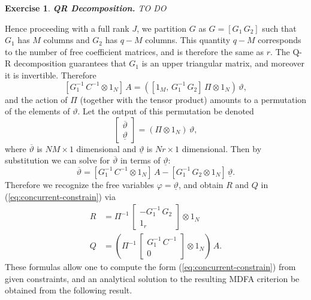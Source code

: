 \documentclass[a4paper]{book}
\newtheorem{Exercise}{Exercise}
\begin{document}
 \begin{Exercise} {\bf QR Decomposition.} \rm
 \label{exer:qr.constraint}
 TO DO
 \end{Exercise}
 
 Hence  proceeding with a full rank $J$, we partition $G$ as $G = [ G_1 \, G_2]$ 
 such that $G_1$ has $M$ columns and $G_2$
 has $q-M$ columns.  This quantity $q-M$ corresponds to the number 
 of free coefficient matrices, and is therefore the same as $r$.
 The Q-R decomposition guarantees that $G_1$ is an upper triangular matrix, 
 and moreover it is invertible.  Therefore
\[
  \left[ G_1^{-1} \, C^{-1} \otimes 1_N \right] \, A  = \left( \left[ 1_M , \, G_1^{-1} \, G_2 \right] \, \Pi \otimes 1_N  \right) \, \vartheta,
\]
 and the action of $\Pi$ (together with the tensor product) amounts 
 to a   permutation of the elements of $\vartheta$.
  Let the output of this permutation be denoted
\[
   \left[ \begin{array}{l} \overline{\vartheta} \\ \underline{\vartheta} \end{array} \right]
   = \left( \Pi \otimes 1_N \right) \, \vartheta,
\]
 where $\overline{\vartheta}$ is $N M \times 1$ dimensional and
 $\underline{\vartheta}$ is $N r \times 1$ dimensional.  
 Then  by substitution we can solve for $\overline{\vartheta}$ in terms 
 of $\underline{\vartheta}$:
\[
   \overline{\vartheta} =  \left[ G_1^{-1} \, C^{-1} \otimes 1_N \right] \, A - 
   \left[  G_1^{-1} \, G_2  \otimes 1_N   \right] \, \underline{\vartheta}.
\]
 Therefore we recognize the free variables $\varphi = \underline{\vartheta}$, 
 and obtain $R$ and $Q$ in (\ref{eq:concurrent-constrain}) via
\begin{align*}
   R & = \Pi^{-1} \, \left[ \begin{array}{c} - G_1^{-1} \, G_2 \\ 1_{r} \end{array} \right] \otimes 1_N  \\
  Q & = \left( \Pi^{-1}  \, \left[ \begin{array}{c}  G_1^{-1} \, C^{-1} \\ 0 \end{array} \right] \otimes 1_N  \right) \, A.
\end{align*}
  These formulas allow one to compute the   form (\ref{eq:concurrent-constrain}) 
   from given constraints, and
 an analytical solution to the resulting MDFA criterion  be obtained from the following result.
\end{document}
